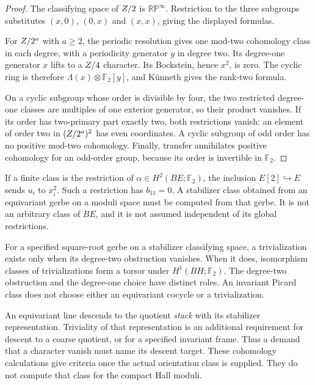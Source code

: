 \begin{proof}
The classifying space of $Z/2$ is $\mathbb{RP}^{\infty}$.
Restriction to the three subgroups substitutes $(x,0)$, $(0,x)$
and $(x,x)$, giving the displayed formulas.

For $Z/2^a$ with $a\ge2$, the periodic resolution gives one
mod-two cohomology class in each degree, with a periodicity generator
$y$ in degree two.  Its degree-one generator $x$ lifts to a
$Z/4$ character.  Its Bockstein, hence $x^2$, is zero.
The cyclic ring is therefore $\Lambda(x)\otimes\mathbb F_2[y]$,
and K\"unneth gives the rank-two formula.

On a cyclic subgroup whose order is divisible by four, the two
restricted degree-one classes are multiples of one exterior
generator, so their product vanishes.  If its order has two-primary
part exactly two, both restrictions vanish: an element of order two
in $(Z/2^a)^2$ has even coordinates.  A cyclic subgroup of odd
order has no positive mod-two cohomology.
Finally, transfer annihilates positive cohomology for an odd-order
group, because its order is invertible in $\mathbb F_2$.
\end{proof}

If a finite class is the restriction of
$\alpha\in H^2(BE;\mathbb F_2)$, the inclusion $E[2]\hookrightarrow E$
sends $u_i$ to $x_i^2$.  Such a restriction has $b_{11}=0$.
A stabilizer class obtained from an equivariant gerbe on a moduli
space must be computed from that gerbe.  It is not an arbitrary class
of $BE$, and it is not assumed independent of its global restrictions.

\begin{remark}
\label{rem:translation-linearization-criterion}
For a specified square-root gerbe on a stabilizer classifying space,
a trivialization exists only when its degree-two obstruction vanishes.
When it does, isomorphism classes of trivializations form a torsor
under $H^1(BH;\mathbb F_2)$.
The degree-two obstruction and the degree-one choice have distinct
roles.  An invariant Picard class does not choose either an
equivariant cocycle or a trivialization.

An equivariant line descends to the quotient \emph{stack} with its
stabilizer representation.  Triviality of that representation is an
additional requirement for descent to a coarse quotient, or for a
specified invariant frame.  Thus a demand that a character vanish
must name its descent target.  These cohomology calculations give
criteria once the actual orientation class is supplied.  They do not
compute that class for the compact Hall moduli.
\end{remark}

